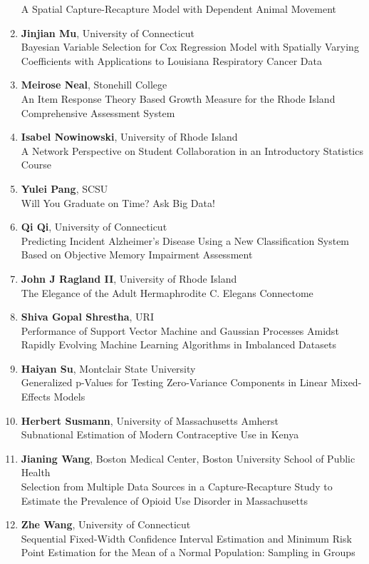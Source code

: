 \begin{enumerate}
A Spatial Capture-Recapture Model with Dependent Animal Movement
\item \textbf{Jinjian Mu}, University of Connecticut \\
Bayesian Variable Selection for Cox Regression Model with Spatially Varying Coefficients with Applications to Louisiana Respiratory Cancer Data
\item \textbf{Meirose Neal}, Stonehill College \\
An Item Response Theory Based Growth Measure for the Rhode Island Comprehensive Assessment System
\item \textbf{Isabel Nowinowski}, University of Rhode Island \\
A Network Perspective on Student Collaboration in an Introductory Statistics Course
\item \textbf{Yulei Pang}, SCSU \\
Will You Graduate on Time? Ask Big Data!
\item \textbf{Qi Qi}, University of Connecticut \\
Predicting Incident Alzheimer's Disease Using a New Classification System Based on Objective Memory Impairment Assessment
\item \textbf{John J Ragland II}, University of Rhode Island \\
The Elegance of the Adult Hermaphrodite C. Elegans Connectome
\item \textbf{Shiva Gopal Shrestha}, URI \\
Performance of Support Vector Machine  and Gaussian Processes Amidst Rapidly Evolving  Machine Learning Algorithms in Imbalanced Datasets
\item \textbf{Haiyan Su}, Montclair State University \\
Generalized p-Values for Testing Zero-Variance Components in Linear Mixed-Effects Models
\item \textbf{Herbert Susmann}, University of Massachusetts Amherst \\
Subnational Estimation of Modern Contraceptive Use in Kenya
\item \textbf{Jianing Wang}, Boston Medical Center, Boston University School of Public Health \\
Selection from Multiple Data Sources in a Capture-Recapture Study to Estimate the Prevalence of Opioid Use Disorder in Massachusetts
\item \textbf{Zhe Wang}, University of Connecticut \\
Sequential Fixed-Width Confidence Interval Estimation and Minimum Risk Point Estimation for the Mean of a Normal Population: Sampling in Groups

\end{enumerate}
